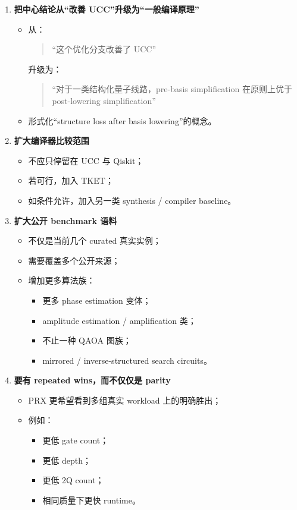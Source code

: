 \documentclass[11pt]{article}
\begin{document}
\begin{enumerate}
    \item \textbf{把中心结论从“改善 UCC”升级为“一般编译原理”}
    \begin{itemize}
        \item 从：
        \begin{quote}
        “这个优化分支改善了 UCC”
        \end{quote}
        升级为：
        \begin{quote}
        “对于一类结构化量子线路，pre-basis simplification 在原则上优于 post-lowering simplification”
        \end{quote}
        \item 形式化“structure loss after basis lowering”的概念。
    \end{itemize}

    \item \textbf{扩大编译器比较范围}
    \begin{itemize}
        \item 不应只停留在 UCC 与 Qiskit；
        \item 若可行，加入 TKET；
        \item 如条件允许，加入另一类 synthesis / compiler baseline。
    \end{itemize}

    \item \textbf{扩大公开 benchmark 语料}
    \begin{itemize}
        \item 不仅是当前几个 curated 真实实例；
        \item 需要覆盖多个公开来源；
        \item 增加更多算法族：
        \begin{itemize}
            \item 更多 phase estimation 变体；
            \item amplitude estimation / amplification 类；
            \item 不止一种 QAOA 图族；
            \item mirrored / inverse-structured search circuits。
        \end{itemize}
    \end{itemize}

    \item \textbf{要有 repeated wins，而不仅仅是 parity}
    \begin{itemize}
        \item PRX 更希望看到多组真实 workload 上的明确胜出；
        \item 例如：
        \begin{itemize}
            \item 更低 gate count；
            \item 更低 depth；
            \item 更低 2Q count；
            \item 相同质量下更快 runtime。
        \end{itemize}
    \end{itemize}


\end{enumerate}
\end{document}
